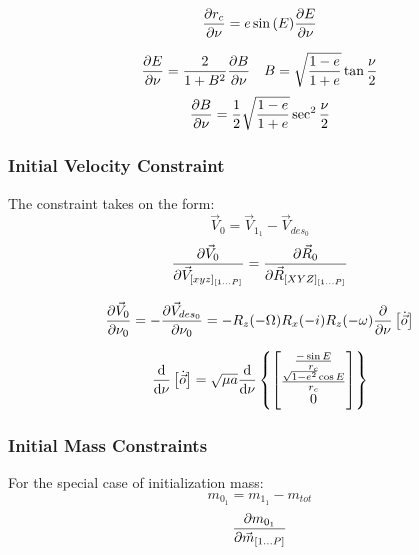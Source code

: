 \begin{equation}
\pdv{r_c}{\nu} = 
e \sin{(E)} \pdv{E}{\nu}
\end{equation}

\begin{align}
\pdv{E}{\nu} = \frac{2}{1 + B^2} \pdv{B}{\nu} &&
B = \sqrt{\frac{1-e}{1+e}} \tan{\frac{\nu}{2}}
\end{align}
\begin{align}
\pdv{B}{\nu} = \frac{1}{2}  \sqrt{\frac{1-e}{1+e}}  \sec^2{\frac{\nu}{2}}
\end{align}

\newpage
\subsubsection{Initial Velocity Constraint}
The constraint takes on the form:
\begin{equation}
\vec{V}_0 = \vec{V}_{1_1} - \vec{V}_{des_0}
\end{equation}
\begin{equation}
\pdv{\vec{V}_0}{\vec{V}_{[xyz]_{[1 ... P]}}} = \pdv{\vec{R}_0}{\vec{R}_{[XYZ]_{[1 ... P]}}}
\end{equation}

\begin{equation}
\pdv{\vec{V}_0}{\nu_0} = -\pdv{\vec{V}_{des_0}}{\nu_0} = 
- R_z (-\Omega) R_x(-i) R_z(-\omega) \pdv{}{\nu}\left[ \dot{\vec{o}} \right]
\end{equation}

\begin{equation}
\dv{}{\nu}\left[ \dot{\vec{o}} \right] = \sqrt{\mu a}  \dv{}{\nu} \left\{  
\begin{bmatrix}
\frac{-\sin {E}}{r_c} \\ \frac{\sqrt{1 - e^2} \cos{E}}{r_c} \\ 0
\end{bmatrix}
\right\}
\end{equation}

\subsubsection{Initial Mass Constraints}
For the special case of initialization mass:
\begin{equation}
m_{0_1} = m_{1_1} - m_{tot}
\end{equation}
\begin{equation}
\pdv{m_{0_1}}{\vec{m}_{[1 ... P]}}
\end{equation}



